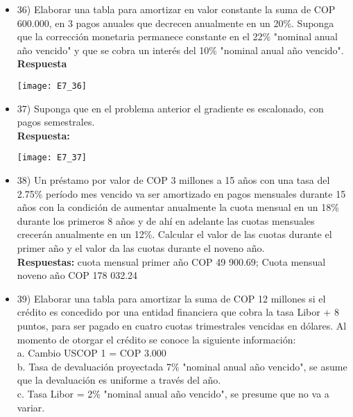 \begin{itemize}
 \item 36) Elaborar una tabla para amortizar en valor constante la suma de COP 600.000, en 3 pagos anuales que decrecen anualmente en un 20\%. Suponga que la corrección monetaria permanece constante en el 22\% "nominal anual año vencido" y que se cobra un interés del 10\% "nominal anual año vencido". \\
       \textbf{Respuesta}
       \begin{center}
        \texttt{[image: E7\_36]}
       \end{center}
       \medskip

 \item  37) Suponga que en el problema anterior el gradiente es escalonado, con pagos semestrales.\\

       \textbf{ Respuesta:}
       \begin{center}
        \texttt{[image: E7\_37]}
       \end{center}
       \medskip

 \item 38)  Un préstamo por valor de COP 3 millones a 15 años con una tasa del 2.75\% período mes vencido  va ser amortizado en pagos mensuales durante 15 años con la condición de aumentar anualmente la cuota mensual en un 18\% durante los primeros 8 años y de ahí en adelante las cuotas mensuales crecerán anualmente en un 12\%. Calcular el valor de las cuotas durante el primer año y el valor da las cuotas durante el noveno año. \\
       \textbf{Respuestas:} cuota mensual primer año COP 49 900.69;
       Cuota mensual noveno año COP 178 032.24
       \medskip

 \item 39)  Elaborar una tabla para amortizar la suma de COP 12 millones si el crédito es concedido por una entidad financiera que cobra la tasa Libor + 8 puntos, para ser pagado en cuatro cuotas trimestrales vencidas en dólares. Al momento de otorgar el crédito se conoce la siguiente información: \\
       a.	Cambio USCOP 1 = COP 3.000 \\
       b.	Tasa de devaluación proyectada 7\% "nominal anual año vencido", se asume que la devaluación es uniforme a través del año. \\
       c.	Tasa Libor = 2\% "nominal anual año vencido", se presume que no va a variar. \\


\end{itemize}
